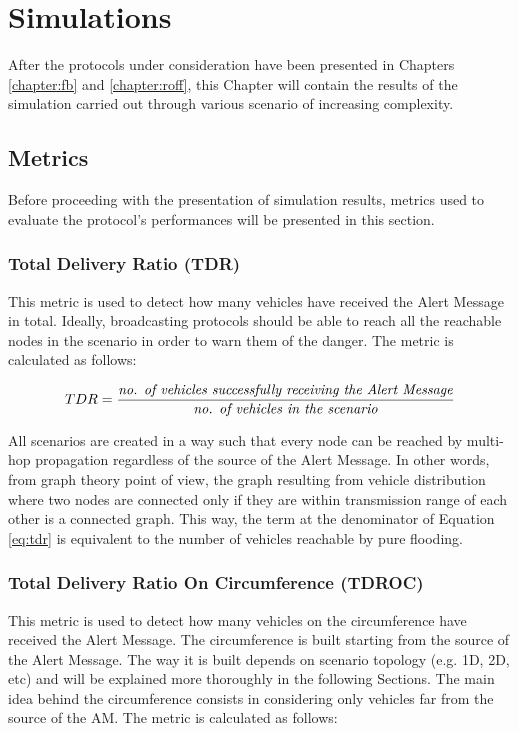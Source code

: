 

\chapter{Simulations}
	After the protocols under consideration have been presented in Chapters \ref{chapter:fb} and \ref{chapter:roff}, this Chapter will contain the results of the simulation carried out through various scenario of increasing complexity.
	
	\section{Metrics}
		Before proceeding with the presentation of simulation results, metrics used to evaluate the protocol's performances will be presented in this section. 
		
		\subsection{Total Delivery Ratio (TDR)}
			\label{ssec:tdr}
			This metric is used to detect how many vehicles have received the Alert Message in total. Ideally, broadcasting protocols should be able to reach all the reachable nodes in the scenario in order to warn them of the danger. The metric is calculated as follows:
			
			\begin{gather}
				\label{eq:tdr}
				TDR = \frac{\textrm{\textit{no. of vehicles successfully receiving the Alert Message}}}{\textrm{\textit{no. of vehicles in the scenario}}}
			\end{gather}
			
			All scenarios are created in a way such that every node can be reached by multi-hop propagation regardless of the source of the Alert Message. In other words, from graph theory point of view, the graph resulting from vehicle distribution where two nodes are connected only if they are within transmission range of each other is a connected graph. This way, the term at the denominator of Equation \ref{eq:tdr} is equivalent to the number of vehicles reachable by pure flooding.
			
		\subsection{Total Delivery Ratio On Circumference (TDROC)}
			This metric is used to detect how many vehicles on the circumference have received the Alert Message. The circumference is built starting from the source of the Alert Message. The way it is built depends on scenario topology (e.g. 1D, 2D, etc) and will be explained more thoroughly in the following Sections. The main idea behind the circumference consists in considering only vehicles far from the source of the AM. The metric is calculated as follows:
			
